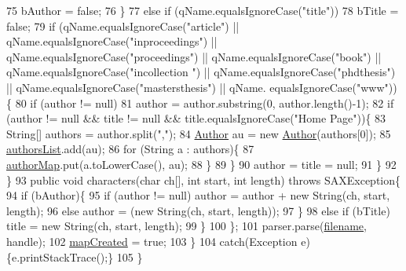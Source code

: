 \begin{DoxyCode}
75                         bAuthor = \textcolor{keyword}{false};
76                     \}
77                     \textcolor{keywordflow}{else} \textcolor{keywordflow}{if} (qName.equalsIgnoreCase(\textcolor{stringliteral}{"title"}))
78                         bTitle = \textcolor{keyword}{false};
79                     \textcolor{keywordflow}{if} (qName.equalsIgnoreCase(\textcolor{stringliteral}{"article"}) || qName.equalsIgnoreCase(\textcolor{stringliteral}{"inproceedings"}) || 
      qName.equalsIgnoreCase(\textcolor{stringliteral}{"proceedings"}) || qName.equalsIgnoreCase(\textcolor{stringliteral}{"book"}) || qName.equalsIgnoreCase(\textcolor{stringliteral}{"incollection
      "}) || qName.equalsIgnoreCase(\textcolor{stringliteral}{"phdthesis"}) || qName.equalsIgnoreCase(\textcolor{stringliteral}{"mastersthesis"}) || qName.
      equalsIgnoreCase(\textcolor{stringliteral}{"www"}))\{
80                         \textcolor{keywordflow}{if} (author != null)
81                             author = author.substring(0, author.length()-1);
82                         \textcolor{keywordflow}{if} (author != null && title != null && title.equalsIgnoreCase(\textcolor{stringliteral}{"Home Page"}))\{
83                             String[] authors = author.split(\textcolor{stringliteral}{","});
84                             \hyperlink{classAuthor}{Author} au = \textcolor{keyword}{new} \hyperlink{classAuthor}{Author}(authors[0]);
85                             \hyperlink{classAuthorManager_a16d40e3ce8111e6d3a8eccf786b1e6c8}{authorsList}.add(au);
86                             \textcolor{keywordflow}{for} (String a : authors)\{
87                                 \hyperlink{classAuthorManager_a0adde1702d5fc9ec68f403848dee10a6}{authorMap}.put(a.toLowerCase(), au);
88                             \}
89                         \}
90                         author = title = null;
91                     \}
92                 \}
93                 \textcolor{keyword}{public} \textcolor{keywordtype}{void} characters(\textcolor{keywordtype}{char} ch[], \textcolor{keywordtype}{int} start, \textcolor{keywordtype}{int} length) \textcolor{keywordflow}{throws} SAXException\{
94                     \textcolor{keywordflow}{if} (bAuthor)\{
95                         \textcolor{keywordflow}{if} (author != null) author = author + \textcolor{keyword}{new} String(ch, start, length);
96                         \textcolor{keywordflow}{else} author = (\textcolor{keyword}{new} String(ch, start, length));
97                     \}
98                     \textcolor{keywordflow}{else} \textcolor{keywordflow}{if} (bTitle) title = \textcolor{keyword}{new} String(ch, start, length);
99                 \}
100             \};
101             parser.parse(\hyperlink{classAuthorManager_ab51e8e8b1326d63e88c21d56a9ea631a}{filename}, handle);
102             \hyperlink{classAuthorManager_a8007cf90e289ab4af6178566708969bc}{mapCreated} = \textcolor{keyword}{true};
103         \}
104         \textcolor{keywordflow}{catch}(Exception e)\{e.printStackTrace();\}
105     \}
\end{DoxyCode}
